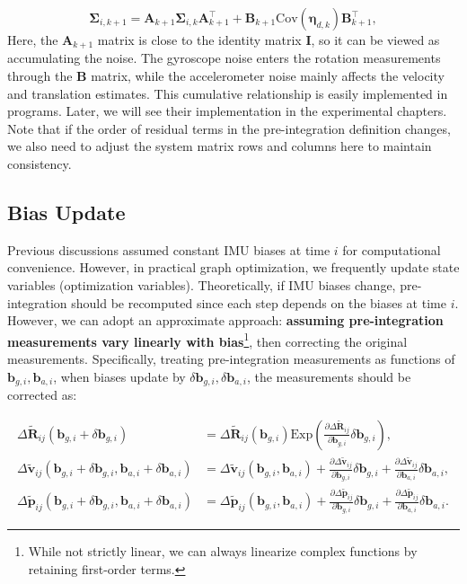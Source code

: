 \begin{equation}\label{eq:preinteg-motion-noise}
	\boldsymbol{\Sigma}_{i, k+1} = \bm{A}_{k+1} \boldsymbol{\Sigma}_{i, k} \bm{A}_{k+1}^\top + \bm{B}_{k+1}
	\mathrm{Cov}(\boldsymbol{\eta}_{d,k}) \bm{B}^\top_{k+1},
\end{equation}
Here, the $\bm{A}_{k+1}$ matrix is close to the identity matrix $\bm{I}$, so it can be viewed as accumulating the noise. The gyroscope noise enters the rotation measurements through the $\bm{B}$ matrix, while the accelerometer noise mainly affects the velocity and translation estimates. This cumulative relationship is easily implemented in programs. Later, we will see their implementation in the experimental chapters. Note that if the order of residual terms in the pre-integration definition changes, we also need to adjust the system matrix rows and columns here to maintain consistency.

\subsection{Bias Update}
Previous discussions assumed constant IMU biases at time $i$ for computational convenience. However, in practical graph optimization, we frequently update state variables (optimization variables). Theoretically, if IMU biases change, pre-integration should be recomputed since each step depends on the biases at time $i$. However, we can adopt an approximate approach: \textbf{assuming pre-integration measurements vary linearly with bias}\footnote{While not strictly linear, we can always linearize complex functions by retaining first-order terms.}, then correcting the original measurements. Specifically, treating pre-integration measurements as functions of $\bm{b}_{g,i}, \bm{b}_{a,i}$, when biases update by $\delta \bm{b}_{g,i}, \delta \bm{b}_{a,i}$, the measurements should be corrected as:

\begin{equation}\label{eq:update-bias}
	\begin{aligned}
		\Delta \tilde{\bm{R}}_{ij}(\bm{b}_{g,i} + \delta \bm{b}_{g,i}) &= \Delta 
		\tilde{\bm{R}}_{ij}(\bm{b}_{g,i}) \mathrm{Exp} \left(\frac{\partial \Delta \tilde{\bm{R}}_{ij}}{\partial 
			\bm{b}_{g,i}} \delta \bm{b}_{g,i}\right), \\
		\Delta \tilde{\bm{v}}_{ij} (\bm{b}_{g,i} + \delta \bm{b}_{g,i}, \bm{b}_{a,i} + \delta \bm{b}_{a,i}) &= 
		\Delta \tilde{\bm{v}}_{ij}(\bm{b}_{g,i}, \bm{b}_{a,i}) + \frac{\partial \Delta 
			\tilde{\bm{v}}_{ij}}{\partial \bm{b}_{g,i}} \delta \bm{b}_{g,i} + \frac{\partial \Delta 
			\tilde{\bm{v}}_{ij}}{\partial \bm{b}_{a,i}} \delta \bm{b}_{a,i}, \\
		\Delta \tilde{\bm{p}}_{ij} (\bm{b}_{g,i} + \delta \bm{b}_{g,i}, \bm{b}_{a,i} + \delta \bm{b}_{a,i}) &= 
		\Delta \tilde{\bm{p}}_{ij}(\bm{b}_{g,i}, \bm{b}_{a,i}) + \frac{\partial \Delta 
			\tilde{\bm{p}}_{ij}}{\partial \bm{b}_{g,i}} \delta \bm{b}_{g,i} + \frac{\partial \Delta 
			\tilde{\bm{p}}_{ij}}{\partial \bm{b}_{a,i}} \delta \bm{b}_{a,i}.
	\end{aligned}
\end{equation}

